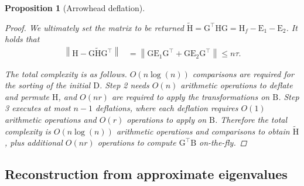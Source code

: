\documentclass{article}
\newcommand{\lnorm}{\left\|}
\newcommand{\rnorm}{\right\|}
\newtheorem{proposition}{Proposition}[section]
\newcommand\matB{\boldsymbol{\mathrm{B}}}
\newcommand\matD{\boldsymbol{\mathrm{D}}}
\newcommand\matE{\boldsymbol{\mathrm{E}}}
\newcommand\matG{\boldsymbol{\mathrm{G}}}
\newcommand\matH{\boldsymbol{\mathrm{H}}}
\newcommand\matHtilde{\widetilde{\boldsymbol{\mathrm{H}}}}
\begin{document}
\begin{proposition}[Arrowhead deflation]
\begin{proof}
        We ultimately set the matrix to be returned $\matHtilde = \matG^\top\matH\matG = \matH_f-\matE_1-\matE_2$. It holds that
        \begin{align*}
            \lnorm \matH-\matG\matHtilde\matG^\top \rnorm
            &=
            \lnorm \matG\matE_1\matG^\top + \matG\matE_2\matG^\top \rnorm
            \leq
            n\tau.
        \end{align*}
        
        The total complexity is as follows. $O(n\log(n))$ comparisons are required for the sorting of the initial $\matD$. Step 2 needs $O(n)$ arithmetic operations to deflate and permute $\matH$, and $O(nr)$ are required to apply the transformations on $\matB$. Step 3 executes at most $n-1$ deflations, where each deflation requires $O(1)$ arithmetic operations and $O(r)$ operations to apply on $\matB$. Therefore the total complexity is $O(n\log(n))$ arithmetic operations and comparisons to obtain $\matHtilde$, plus additional $O(nr)$ operations to compute $\matG^\top\matB$ on-the-fly.
    \end{proof}
\end{proposition}


\subsection{Reconstruction from approximate eigenvalues}
\end{document}
